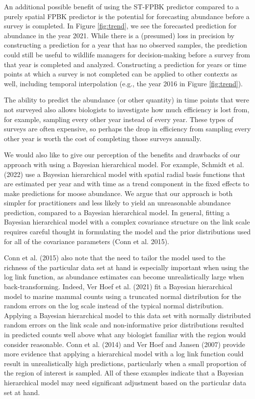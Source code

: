 \documentclass[]{article}    %
\begin{document}
An additional possible benefit of using the ST-FPBK predictor compared
to a purely spatial FPBK predictor is the potential for forecasting
abundance before a survey is completed. In Figure \ref{fig:trend}, we
see the forecasted prediction for abundance in the year 2021. While
there is a (presumed) loss in precision by constructing a prediction for
a year that has no observed samples, the prediction could still be
useful to wildlife managers for decision-making before a survey from
that year is completed and analyzed. Constructing a prediction for years
or time points at which a survey is not completed can be applied to
other contexts as well, including temporal interpolation (e.g., the year
2016 in Figure \ref{fig:trend}).

The ability to predict the abundance (or other quantity) in time points
that were not surveyed also allows biologists to investigate how much
efficiency is lost from, for example, sampling every other year instead
of every year. These types of surveys are often expensive, so perhaps
the drop in efficiency from sampling every other year is worth the cost
of completing those surveys annually.

We would also like to give our perception of the benefits and drawbacks
of our approach with using a Bayesian hierarchical model. For example,
Schmidt et al. (2022) use a Bayesian hierarchical model with spatial
radial basis functions that are estimated per year and with time as a
trend component in the fixed effects to make predictions for moose
abundance. We argue that our approach is both simpler for practitioners
and less likely to yield an unreasonable abundance prediction, compared
to a Bayesian hierarchical model. In general, fitting a Bayesian
hierarchical model with a complex covariance structure on the link scale
requires careful thought in formulating the model and the prior
distributions used for all of the covariance parameters (Conn et al.
2015).

Conn et al. (2015) also note that the need to tailor the model used to
the richness of the particular data set at hand is especially important
when using the log link function, as abundance estimates can become
unrealistically large when back-transforming. Indeed, Ver Hoef et al.
(2021) fit a Bayesian hierarchical model to marine mammal counts using a
truncated normal distribution for the random errors on the log scale
instead of the typical normal distribution. Applying a Bayesian
hierarchical model to this data set with normally distributed random
errors on the link scale and non-informative prior distributions
resulted in predicted counts well above what any biologist familiar with
the region would consider reasonable. Conn et al. (2014) and Ver Hoef
and Jansen (2007) provide more evidence that applying a hierarchical
model with a log link function could result in unrealistically high
predictions, particularly when a small proportion of the region of
interest is sampled. All of these examples indicate that a Bayesian
hierarchical model may need significant adjustment based on the
particular data set at hand.
\end{document}
